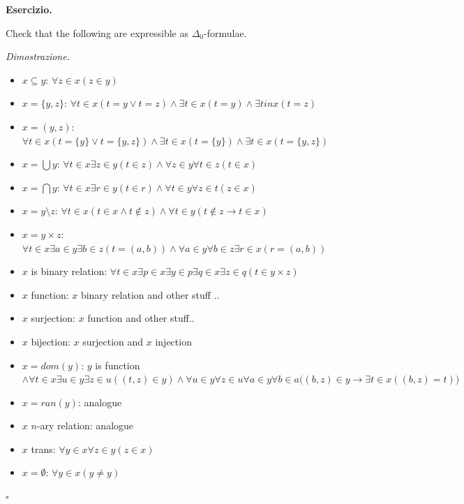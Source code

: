 \documentclass[a4paper,12pt]{article}
\newenvironment{exercise}
  {\par\vspace{1em}\noindent\textbf{Esercizio.} }
  {\par\vspace{1em}}
\newenvironment{proof}
  {\par\vspace{0.5em}\noindent\textit{Dimostrazione.} }
  {\par\vspace{1em}\hfill$\square$}
\begin{document}
\begin{exercise}

	Check that the following are expressible as $\Delta_0$-formulae.

\end{exercise}

\begin{proof}

	\begin{itemize}
		\item	$x \subseteq y$: $\forall z \in x (z \in y)$
		\item	$x = \{y,z\}$: $\forall t \in x (t = y \lor t = z) \land \exists t \in x (t = y) \land \exists t in x (t = z)$ 
		\item	$x = (y,z)$: $\forall t \in x (t = \{y\} \lor t = \{y,z\}) \land \exists t \in x (t = \{y\}) \land \exists t \in x (t = \{y,z\})$
		\item	$x = \bigcup y$: $\forall t \in x \exists z \in y (t \in z) \land \forall z \in y \forall t \in z (t \in x)$
		\item	$x = \bigcap y$: $\forall t \in x \exists r \in y (t \in r) \land \forall t \in y \forall z \in t (z \in x)$
		\item	$x = y \setminus z$: $\forall t \in x (t \in x \land t \not \in z) \land \forall t \in y (t \not \in z \to t \in x)$
		\item	$x = y \times z$: $\forall t \in x \exists a \in y \exists b \in z (t = (a,b)) \land \forall a \in y \forall b \in z \exists r \in x (r = (a,b))$
		\item	$x$ is binary relation: $\forall t \in x \exists p \in x \exists y \in p \exists q \in x \exists z \in q (t \in y \times z)$
		\item	$x$ function: $x$ binary relation and other stuff ..
		\item	$x$ surjection: $x$ function and other stuff..
		\item	$x$ bijection: $x$ surjection and $x$ injection
		\item	$x = dom(y)$: $y$ is function $\land \forall t \in x \exists u \in y \exists z \in u ((t,z) \in y) \land 
			\forall u \in y \forall z \in u \forall a \in y \forall b \in a \bigg( (b,z) \in y \to \exists t \in x ((b,z) = t) \bigg)$
		\item	$x = ran(y)$: analogue
		\item	$x$ $n$-ary relation: analogue
		\item	$x$ trans: $\forall y \in x \forall z \in y (z \in x)$
		\item	$x = \emptyset$: $\forall y \in x (y \not = y)$

\end{itemize}
\end{proof}
\end{document}
